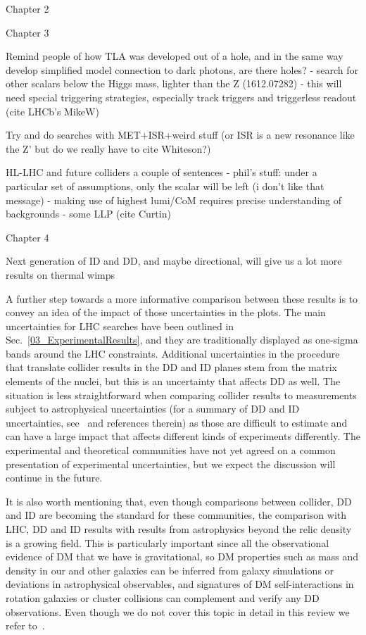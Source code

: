 Chapter 2




Chapter 3

Remind people of how TLA was developed out of a hole, and in the same way develop simplified model connection to dark photons, are there holes?
- search for other scalars below the Higgs mass, lighter than the Z (1612.07282)
- this will need special triggering strategies, especially track triggers and triggerless readout (cite LHCb's MikeW)

Try and do searches with MET+ISR+weird stuff (or ISR is a new resonance like the Z' but do we really have to cite Whiteson?)

HL-LHC and future colliders a couple of sentences
- phil's stuff: under a particular set of assumptions, only the scalar will be left (i don't like that message)
- making use of highest lumi/CoM requires precise understanding of backgrounds
- some LLP (cite Curtin)

Chapter 4

Next generation of ID and DD, and maybe directional, will give us a lot more results on thermal wimps

A further step towards a more informative comparison between these results is to convey an idea of the impact of those uncertainties in the plots. 
The main uncertainties for LHC searches have been outlined in Sec.~\ref{03_ExperimentalResults}, and they are traditionally displayed as one-sigma bands around the LHC constraints. 
Additional uncertainties in the procedure that translate collider results in the DD and ID planes stem from the matrix elements of the nuclei, but this is an uncertainty that
affects DD as well. %
The situation is less straightforward when comparing collider results to measurements subject to astrophysical uncertainties (for a summary of DD and ID uncertainties, see~\cite{Feldstein:2014ufa,d300ef23986a49099715e661295a4d72} and references therein) as those are difficult to estimate and can have a large impact that affects different kinds of experiments differently. 
The experimental and theoretical communities have not yet agreed on a common presentation of experimental uncertainties, but we expect the discussion will continue in the future. 


It is also worth mentioning that, even though comparisons between collider, DD and ID are becoming the standard for these communities,
the comparison with LHC, DD and ID results with results from astrophysics beyond the relic density is a growing field. 
This is particularly important since all the observational evidence of DM that we have is gravitational,
so DM properties such as mass and density in our and other galaxies
can be inferred from galaxy simulations or deviations in astrophysical observables, 
and signatures of DM self-interactions in rotation galaxies or cluster collisions can complement and verify any DD 
observations. Even though we do not cover this topic in detail in this review we refer to~\cite{Buckley:2017ijx}. 